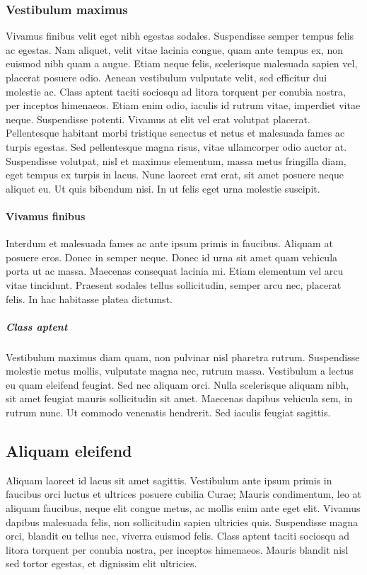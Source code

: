 \documentclass[11pt, a4paper]{memoir}
\begin{document}
\subsubsection{Vestibulum maximus}
Vivamus finibus velit eget nibh egestas sodales. Suspendisse semper tempus felis ac egestas. Nam aliquet, velit vitae lacinia congue, quam ante tempus ex, non euismod nibh quam a augue. Etiam neque felis, scelerisque malesuada sapien vel, placerat posuere odio. Aenean vestibulum vulputate velit, sed efficitur dui molestie ac. Class aptent taciti sociosqu ad litora torquent per conubia nostra, per inceptos himenaeos. Etiam enim odio, iaculis id rutrum vitae, imperdiet vitae neque. Suspendisse potenti. Vivamus at elit vel erat volutpat placerat. Pellentesque habitant morbi tristique senectus et netus et malesuada fames ac turpis egestas. Sed pellentesque magna risus, vitae ullamcorper odio auctor at. Suspendisse volutpat, nisl et maximus elementum, massa metus fringilla diam, eget tempus ex turpis in lacus. Nunc laoreet erat erat, sit amet posuere neque aliquet eu. Ut quis bibendum nisi. In ut felis eget urna molestie suscipit.

\paragraph{Vivamus finibus}
Interdum et malesuada fames ac ante ipsum primis in faucibus. Aliquam at posuere eros. Donec in semper neque. Donec id urna sit amet quam vehicula porta ut ac massa. Maecenas consequat lacinia mi. Etiam elementum vel arcu vitae tincidunt. Praesent sodales tellus sollicitudin, semper arcu nec, placerat felis. In hac habitasse platea dictumst.

\subparagraph{Class aptent}
Vestibulum maximus diam quam, non pulvinar nisl pharetra rutrum. Suspendisse molestie metus mollis, vulputate magna nec, rutrum massa. Vestibulum a lectus eu quam eleifend feugiat. Sed nec aliquam orci. Nulla scelerisque aliquam nibh, sit amet feugiat mauris sollicitudin sit amet. Maecenas dapibus vehicula sem, in rutrum nunc. Ut commodo venenatis hendrerit. Sed iaculis feugiat sagittis.

\subsection{Aliquam eleifend}
Aliquam laoreet id lacus sit amet sagittis. Vestibulum ante ipsum primis in faucibus orci luctus et ultrices posuere cubilia Curae; Mauris condimentum, leo at aliquam faucibus, neque elit congue metus, ac mollis enim ante eget elit. Vivamus dapibus malesuada felis, non sollicitudin sapien ultricies quis. Suspendisse magna orci, blandit eu tellus nec, viverra euismod felis. Class aptent taciti sociosqu ad litora torquent per conubia nostra, per inceptos himenaeos. Mauris blandit nisl sed tortor egestas, et dignissim elit ultricies.
\end{document}
